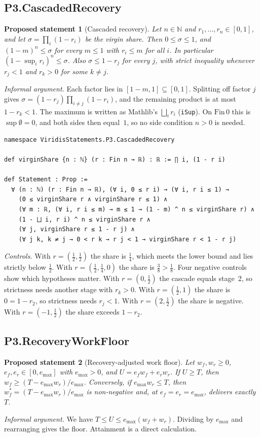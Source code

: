 \documentclass[11pt]{article}
\newtheorem{proposal}{Proposed statement}
\theoremstyle{remark}
\begin{document}
\subsection{P3.CascadedRecovery}
\begin{proposal}[Cascaded recovery]
Let $n\in\mathbb{N}$ and $r_1,\dots,r_n\in[0,1]$, and let $\sigma=\prod_i(1-r_i)$ be the virgin
share. Then $0\le\sigma\le1$, and $(1-m)^n\le\sigma$ for every $m\le 1$ with $r_i\le m$ for all
$i$. In particular $(1-\sup_i r_i)^n\le\sigma$. Also $\sigma\le 1-r_j$ for every $j$, with strict
inequality whenever $r_j<1$ and $r_k>0$ for some $k\ne j$.
\end{proposal}
\emph{Informal argument.} Each factor lies in $[1-m,1]\subseteq[0,1]$. Splitting off factor $j$
gives $\sigma=(1-r_j)\prod_{i\ne j}(1-r_i)$, and the remaining product is at most $1-r_k<1$.
The maximum is written as Mathlib's $\bigsqcup_i r_i$ (\texttt{iSup}). On $\mathrm{Fin}\,0$ this
is $\sup\emptyset=0$, and both sides then equal~$1$, so no side condition $n>0$ is needed.

\begin{lstlisting}[caption={Core of \texttt{proposals/P3.CascadedRecovery.lean}.}]
namespace ViridisStatements.P3.CascadedRecovery

def virginShare {n : ℕ} (r : Fin n → ℝ) : ℝ := ∏ i, (1 - r i)

def Statement : Prop :=
  ∀ (n : ℕ) (r : Fin n → ℝ), (∀ i, 0 ≤ r i) → (∀ i, r i ≤ 1) →
    (0 ≤ virginShare r ∧ virginShare r ≤ 1) ∧
    (∀ m : ℝ, (∀ i, r i ≤ m) → m ≤ 1 → (1 - m) ^ n ≤ virginShare r) ∧
    (1 - ⨆ i, r i) ^ n ≤ virginShare r ∧
    (∀ j, virginShare r ≤ 1 - r j) ∧
    (∀ j k, k ≠ j → 0 < r k → r j < 1 → virginShare r < 1 - r j)
\end{lstlisting}

\emph{Controls.} With $r=(\tfrac12,\tfrac12)$ the share is $\tfrac14$, which meets the lower
bound and lies strictly below $\tfrac12$. With $r=(\tfrac12,\tfrac14,0)$ the share is
$\tfrac38>\tfrac18$. Four negative controls show which hypotheses matter. With $r=(0,\tfrac12)$
the cascade equals stage~2, so strictness needs another stage with $r_k>0$. With
$r=(\tfrac12,1)$ the share is $0=1-r_2$, so strictness needs $r_j<1$. With $r=(2,\tfrac12)$ the
share is negative. With $r=(-1,\tfrac12)$ the share exceeds $1-r_2$.

\subsection{P3.RecoveryWorkFloor}
\begin{proposal}[Recovery-adjusted work floor]
Let $w_f,w_r\ge0$, $e_f,e_r\in[0,e_{\max}]$ with $e_{\max}>0$, and $U=e_fw_f+e_rw_r$. If $U\ge T$,
then $w_f\ge (T-e_{\max}w_r)/e_{\max}$. Conversely, if $e_{\max}w_r\le T$, then
$w_f^\ast=(T-e_{\max}w_r)/e_{\max}$ is non-negative and, at $e_f=e_r=e_{\max}$, delivers exactly $T$.
\end{proposal}
\emph{Informal argument.} We have $T\le U\le e_{\max}(w_f+w_r)$. Dividing by $e_{\max}$ and
rearranging gives the floor. Attainment is a direct calculation.
\end{document}
